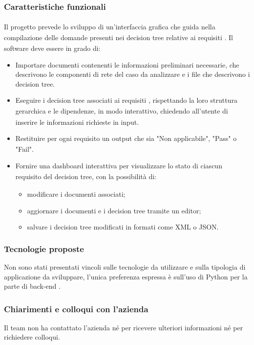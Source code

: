 \documentclass[a4paper,11pt]{article}
\begin{document}
\subsubsection{Caratteristiche funzionali\textsubscript{}
}
Il progetto\textsubscript{}
 prevede lo sviluppo di un'interfaccia\textsubscript{} grafica che guida nella compilazione delle domande presenti nei decision tree relative ai requisiti\textsubscript{}
. 
Il software deve essere in grado di:

\begin{itemize}[leftmargin=*]
  \item Importare documenti contenenti le informazioni preliminari necessarie, che descrivono le componenti di rete del caso da analizzare e i file che descrivono i decision tree.
  \item Eseguire i decision tree associati ai requisiti\textsubscript{}
, rispettando la loro struttura gerarchica e le dipendenze\textsubscript{}, in modo interattivo, chiedendo all'utente di inserire le informazioni richieste in input.
  \item Restituire per ogni requisito\textsubscript{}
 un output che sia "Non applicabile", "Pass" o "Fail".
  \item Fornire una dashboard\textsubscript{}
 interattiva per visualizzare lo stato di ciascun requisito\textsubscript{}
 del decision tree, con la possibilità di:
  \begin{itemize}[leftmargin=*]
    \item modificare i documenti associati; 
    \item aggiornare i documenti e i decision tree tramite un editor; 
    \item salvare i decision tree modificati in formati come XML o JSON.
  \end{itemize}
\end{itemize}
\subsubsection{Tecnologie proposte}
Non sono stati presentati vincoli sulle tecnologie da utilizzare e sulla tipologia di applicazione da sviluppare, l'unica preferenza espressa è sull'uso di Python per la parte di back-end\textsubscript{}
.
\subsubsection{Chiarimenti e colloqui con l'azienda}
Il team non ha contattato l'azienda né per ricevere ulteriori informazioni né per richiedere colloqui.
\end{document}
